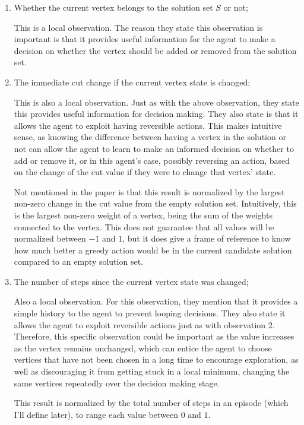 \documentclass{article}
\begin{document}
\begin{enumerate}
    \item Whether the current vertex belongs to the solution set $S$ or not; 
    
    This is a local observation. The reason they state this observation is important is that it provides useful information for the agent to make a decision on whether the vertex should be added or removed from the solution set. 

    \item The immediate cut change if the current vertex state is changed;
    
    This is also a local observation. Just as with the above observation, they state this provides useful information for decision making. They also state is that it allows the agent to exploit having reversible actions. This makes intuitive sense, as knowing the difference between having a vertex in the solution or not can allow the agent to learn to make an informed decision on whether to add or remove it, or in this agent's case, possibly reversing an action, based on the change of the cut value if they were to change that vertex' state.

    Not mentioned in the paper is that this result is normalized by the largest non-zero change in the cut value from the empty solution set. Intuitively, this is the largest non-zero weight of a vertex, being the sum of the weights connected to the vertex. This does not guarantee that all values will be normalized between $-1$ and $1$, but it does give a frame of reference to know how much better a greedy action would be in the current candidate solution compared to an empty solution set. 

    \item The number of steps since the current vertex state was changed;
    
    Also a local observation. For this observation, they mention that it provides a simple history to the agent to prevent looping decisions. They also state it allows the agent to exploit reversible actions just as with observation 2. Therefore, this specific observation could be important as the value increases as the vertex remains unchanged, which can entice the agent to choose vertices that have not been chosen in a long time to encourage exploration, as well as discouraging it from getting stuck in a local minimum, changing the same vertices repeatedly over the decision making stage.

    This result is normalized by the total number of steps in an episode (which I'll define later), to range each value between $0$ and $1$. 
    

\end{enumerate}
\end{document}
